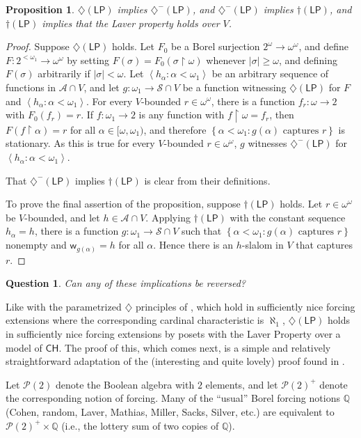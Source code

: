 \documentclass[11pt,leqno]{amsart}
\newtheorem{proposition}[theorem]{Proposition}
\newtheorem{question}[theorem]{Question}
\theoremstyle{definition}
\theoremstyle{remark}
\newcommand{\Q}{\mathbb{Q}}
\newcommand{\A}{\mathcal{A}}
\renewcommand{\P}{\mathcal{P}}
\newcommand{\explicitSet}[1]{\left\lbrace #1 \right\rbrace}
\newcommand{\brackets}[1]{\left\langle #1 \right\rangle}
\newcommand{\set}[2]{\explicitSet{#1 \colon #2}}
\newcommand{\seq}[2]{\brackets{#1 \colon #2}}
\newcommand{\<}{\langle}
\renewcommand{\>}{\rangle}
\renewcommand{\a}{\alpha}
\newcommand{\s}{\sigma}
\newcommand{\w}{\omega}
\newcommand{\0}{\emptyset}
\newcommand{\rest}{\!\restriction\!}
\newcommand{\1}{1\hspace{-1.75mm}1}
\newcommand{\ch}{\ensuremath{\mathsf{CH}}\xspace}
\newcommand{\dLP}{\diamondsuit(\mathsf{LP})}
\newcommand{\dLPm}{\diamondsuit^-(\mathsf{LP})}
\newcommand{\cLP}{\dagger(\mathsf{LP})}
\begin{document}
\begin{proposition}
$\dLP$ implies $\dLPm$, and $\dLPm$ implies $\cLP$, and $\cLP$ implies that the Laver property holds over $V$. 
\end{proposition}
\begin{proof}
Suppose $\dLP$ holds. 
Let $F_0$ be a Borel surjection $2^\w \to \w^\w$, and define $F: 2^{<\w_1} \to \w^\w$ by setting $F(\s) = F_0(\s \rest \w)$ whenever $|\s| \geq \w$, and defining $F(\s)$ arbitrarily if $|\s| < \w$. 
Let $\seq{h_\a}{\a < \w_1}$ be an arbitrary sequence of functions in $\A \cap V$, and 
let $g: \w_1 \to \mathcal S \cap V$ be a function witnessing $\dLP$ for $F$ and $\seq{h_\a}{\a < \w_1}$. 
For every $V$-bounded $r \in \w^\w$, there is a function $f_r: \w \to 2$ with $F_0(f_r) = r$. 
If $f: \w_1 \to 2$ is any function with $f \rest \w = f_r$, then $F(f \rest \a) = r$ for all $\a \in [\w,\w_1)$, and therefore $\set{\a < \w_1}{g(\a) \text{ captures } r}$ is stationary. As this is true for every $V$-bounded $r \in \w^\w$, $g$ witnesses $\dLPm$ for $\seq{h_\a}{\a < \w_1}$. 

That $\dLPm$ implies $\cLP$ is clear from their definitions. 

To prove the final assertion of the proposition, suppose $\cLP$ holds. Let $r \in \w^\w$ be $V$-bounded, and let $h \in \A \cap V$. Applying $\cLP$ with the constant sequence $h_\a = h$, there is a function $g: \w_1 \to \mathcal S \cap V$ such that $\set{\a < \w_1}{g(\a) \text{ captures } r}$ nonempty and $\mathsf{w}_{g(\a)} = h$ for all $\a$. Hence there is an $h$-slalom in $V$ that captures $r$. 
\end{proof}

\begin{question}
Can any of these implications be reversed?
\end{question}

Like with the parametrized $\diamondsuit$ principles of \cite{MHD}, which hold in sufficiently nice forcing extensions where the corresponding cardinal characteristic is $\aleph_1$, $\dLP$ holds in sufficiently nice forcing extensions by posets with the Laver Property over a model of \ch. The proof of this, which comes next, is a simple and relatively straightforward adaptation of the (interesting and quite lovely) proof found in \cite{MHD}. 

Let $\P(2)$ denote the Boolean algebra with $2$ elements, and let $\P(2)^+$ denote the corresponding notion of forcing. Many of the ``usual'' Borel forcing notions $\Q$ (Cohen, random, Laver, Mathias, Miller, Sacks, Silver, etc.) are equivalent to $\P(2)^+ \times \Q$ (i.e., the lottery sum of two copies of $\Q$). 
\end{document}
